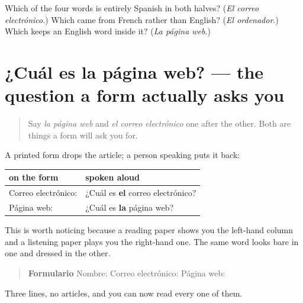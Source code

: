 \begin{tcolorbox}[breakable,colback=teal!4,colframe=teal!35!black,title={Before you move on}]
Which of the four words is entirely Spanish in both halves? (\emph{El correo electrónico}.) Which came from French rather than English? (\emph{El ordenador}.) Which keeps an English word inside it? (\emph{La página web}.)
\end{tcolorbox}
\section[¿Cuál es la página web?]{¿Cuál es la página web? — the question a form actually asks you}

\label{lesson:ES-C422-sintesis-buscar}



\begin{quote}
Say \emph{la página web} and \emph{el correo electrónico} one after the other. Both are things a form will ask you for.
\end{quote}

\begin{grammarlens}[title={Grammar Lens: the line on a form is the bare noun}]
A printed form drops the article; a person speaking puts it back:

\noindent
\begin{tabularx}{\linewidth}{@{}>{\raggedright\arraybackslash}X>{\raggedright\arraybackslash}X@{}}
\toprule
\textbf{on the form} & \textbf{spoken aloud} \\
\midrule
Correo electrónico: & ¿Cuál es \textbf{el} correo electrónico? \\
Página web: & ¿Cuál es \textbf{la} página web? \\
\bottomrule
\end{tabularx}

This is worth noticing because a reading paper shows you the left-hand column and a listening paper plays you the right-hand one. The same word looks bare in one and dressed in the other.
\end{grammarlens}

\begin{tcolorbox}[breakable,skin=enhanced,colback=orange!6,colframe=orange!45!black,boxrule=0.5pt,arc=1mm,left=6pt,right=6pt,top=4pt,bottom=4pt,fonttitle=\bfseries,title={Read this}]
\begin{quote}
\textbf{Formulario} Nombre: Correo electrónico: Página web:
\end{quote}

Three lines, no articles, and you can now read every one of them.
\end{tcolorbox}

